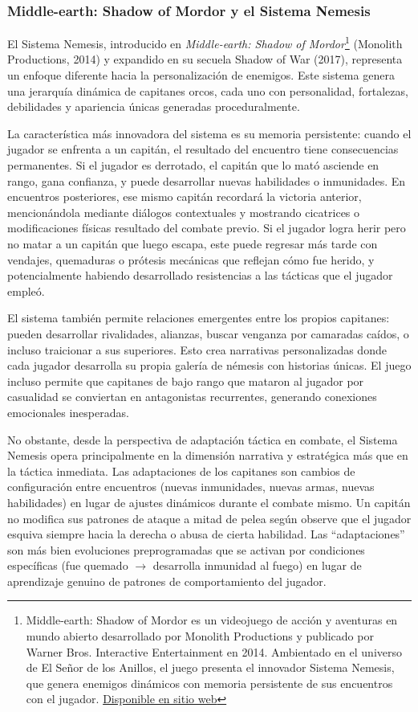 \documentclass[informe]{upropuesta}
\begin{document}
\subsubsection*{Middle-earth: Shadow of Mordor y el Sistema Nemesis}

El Sistema Nemesis, introducido en \textit{Middle-earth: Shadow of Mordor}\footnote{Middle-earth: Shadow of Mordor es un videojuego de acción y aventuras en mundo abierto desarrollado por Monolith Productions y publicado por Warner Bros. Interactive Entertainment en 2014. Ambientado en el universo de El Señor de los Anillos, el juego presenta el innovador Sistema Nemesis, que genera enemigos dinámicos con memoria persistente de sus encuentros con el jugador. \href{https://www.shadowofmordor.com/}{Disponible en sitio web}} (Monolith Productions, 2014) y expandido en su secuela Shadow of War (2017), representa un enfoque diferente hacia la personalización de enemigos. Este sistema genera una jerarquía dinámica de capitanes orcos, cada uno con personalidad, fortalezas, debilidades y apariencia únicas generadas proceduralmente.

La característica más innovadora del sistema es su memoria persistente: cuando el jugador se enfrenta a un capitán, el resultado del encuentro tiene consecuencias permanentes. Si el jugador es derrotado, el capitán que lo mató asciende en rango, gana confianza, y puede desarrollar nuevas habilidades o inmunidades. En encuentros posteriores, ese mismo capitán recordará la victoria anterior, mencionándola mediante diálogos contextuales y mostrando cicatrices o modificaciones físicas resultado del combate previo. Si el jugador logra herir pero no matar a un capitán que luego escapa, este puede regresar más tarde con vendajes, quemaduras o prótesis mecánicas que reflejan cómo fue herido, y potencialmente habiendo desarrollado resistencias a las tácticas que el jugador empleó.

El sistema también permite relaciones emergentes entre los propios capitanes: pueden desarrollar rivalidades, alianzas, buscar venganza por camaradas caídos, o incluso traicionar a sus superiores. Esto crea narrativas personalizadas donde cada jugador desarrolla su propia galería de némesis con historias únicas. El juego incluso permite que capitanes de bajo rango que mataron al jugador por casualidad se conviertan en antagonistas recurrentes, generando conexiones emocionales inesperadas.

No obstante, desde la perspectiva de adaptación táctica en combate, el Sistema Nemesis opera principalmente en la dimensión narrativa y estratégica más que en la táctica inmediata. Las adaptaciones de los capitanes son cambios de configuración entre encuentros (nuevas inmunidades, nuevas armas, nuevas habilidades) en lugar de ajustes dinámicos durante el combate mismo. Un capitán no modifica sus patrones de ataque a mitad de pelea según observe que el jugador esquiva siempre hacia la derecha o abusa de cierta habilidad. Las ``adaptaciones'' son más bien evoluciones preprogramadas que se activan por condiciones específicas (fue quemado $\rightarrow$ desarrolla inmunidad al fuego) en lugar de aprendizaje genuino de patrones de comportamiento del jugador.
\end{document}
